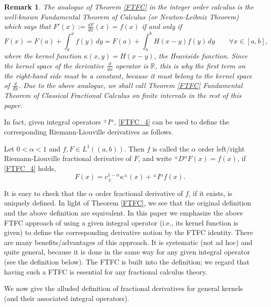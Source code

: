 \documentclass[leqno,final]{siamltex}
\numberwithin{equation}{section}
\newtheorem{remark}{Remark}[section]
\renewcommand{\(}{\bigl(}
\renewcommand{\)}{\bigr)}
\newcommand{\R}{\mathbb{R}}
\begin{document}
\begin{remark}     
 The analogue of Theorem \ref{FTFC} in the integer order calculus is the well-known 
 {\em Fundamental Theorem of Calculus (or Newton-Leibniz Theorem)} which says that $F'(x):=\frac{dF}{dx}(x)=f(x)$ if 
 and only if 
 \[
 F(x)= F(a) + \int_a^x f(y)\, dy =  F(a) + \int_a^b H(x-y) f(y)\, dy\qquad \forall x\in [a,b],
 \]
 where the kernel function $\kappa(x,y)= H(x-y)$, the Heaviside function. Since 
 the kernel space of the derivative $\frac{d}{dx}$ operator is $\R$, this is why the first 
 term  on the right-hand side must be a constant, because it must belong to the kernel 
 space of $\frac{d}{dx}$. 
 Due to the above analogue, we shall call Theorem \ref{FTFC} {\em Fundamental Theorem of 
 	Classical Fractional Calculus} on finite intervals in the rest of this paper.
\end{remark}
    
In fact, given integral operators ${^{\pm}}{I}{^{\alpha}}$,   \eqref{FTFC_4} 
can be used to define the corresponding Riemann-Liouville derivatives as follows.

  \begin{definition} \label{FTFC_def} 
	Let $0<\alpha <1$ and $f , F\in L^{1}((a,b))$. Then $f$ is called  the $\alpha$ order left/right  
	Riemann-Liouville fractional derivative of $F$, and write ${^{\pm}}{D}{^{\alpha}}F(x) = f(x)$, 
	if \eqref{FTFC_4} holds,
	\begin{equation} \label{FTFC_5} 
	F(x) = c_{\pm}^{1- \alpha} \kappa^{\pm}(x) + {^{\pm}}{I}{^{\alpha}}f(x).
	\end{equation}

\end{definition} 

It is easy to check that the $\alpha$ order fractional derivative of $f$, if it exists, 
is uniquely defined.  In light of Theorem \ref{FTFC},  we see that the original definition 
and the above definition are equivalent. 
%
In this paper we emphasize the above FTFC approach of using a given integral 
operator (i.e.,  its kernel function is given) to define the corresponding derivative 
notion by the FTFC identity.  There are many benefits/advantages of this approach. 
It is systematic (not ad hoc) and quite general, because it is done in the same way for 
any given integral operator (see the definition below). The FTFC is built into the 
definition; we regard that having such a FTFC is essential for any fractional calculus 
theory.  

We now give the alluded definition of fractional derivatives for general kernels (and their associated integral operators). 
\end{document}
